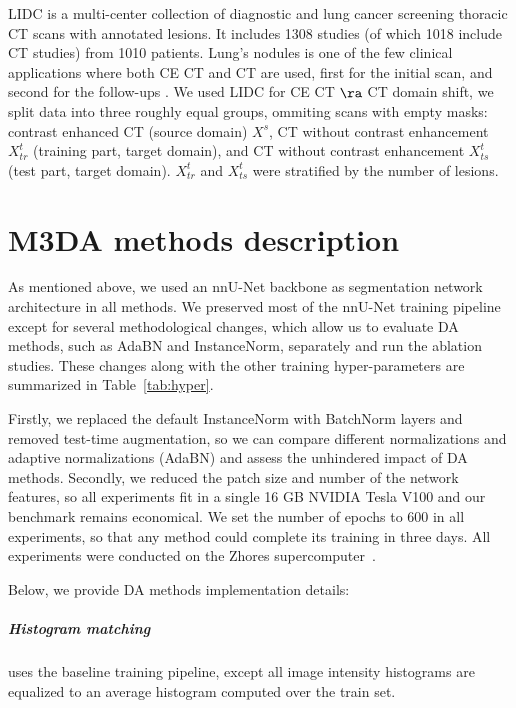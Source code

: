 LIDC \cite{lidc} is a multi-center collection of diagnostic and lung cancer screening thoracic CT scans with annotated lesions. It includes 1308 studies (of which 1018 include CT studies) from 1010 patients. Lung's nodules is one of the few clinical applications where both CE CT and CT are used, first for the initial scan, and second for the follow-ups \cite{purysko2016does}. We used LIDC for CE CT $\ra$ CT domain shift, we split data into three roughly equal groups, ommiting scans with empty masks: contrast enhanced CT (source domain) $X^s$, CT without contrast enhancement $X^t_{tr}$ (training part, target domain), and CT without contrast enhancement  $X^t_{ts}$ (test part, target domain). $X^t_{tr}$ and $X^t_{ts}$ were stratified by the number of lesions.


\chapter{M3DA methods description}
\label{app:m3da_methods}

As mentioned above, we used an nnU-Net \cite{nnunet} backbone as segmentation network architecture in all methods. We preserved most of the nnU-Net training pipeline except for several methodological changes, which allow us to evaluate DA methods, such as AdaBN and InstanceNorm, separately and run the ablation studies. These changes along with the other training hyper-parameters are summarized in Table~\ref{tab:hyper}.

Firstly, we replaced the default InstanceNorm with BatchNorm layers and removed test-time augmentation, so we can compare different normalizations and adaptive normalizations (AdaBN) and assess the unhindered impact of DA methods. Secondly, we reduced the patch size and number of the network features, so all experiments fit in a single 16 GB NVIDIA Tesla V100 and our benchmark remains economical. We set the number of epochs to 600 in all experiments, so that any method could complete its training in three days. All experiments were conducted on the Zhores supercomputer~\cite{zacharov2019zhores}.



Below, we provide DA methods implementation details:

\paragraph{Histogram matching} uses the baseline training pipeline, except all image intensity histograms are equalized to an average histogram computed over the train set. 

